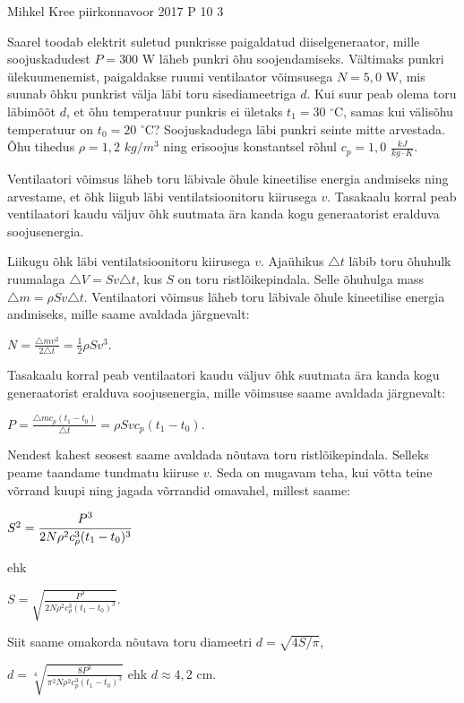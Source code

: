 {Mihkel Kree} %
{piirkonnavoor} %
{2017} %
{P 10} %
{3} %
{

\ifStatement
Saarel toodab elektrit suletud punkrisse paigaldatud diiselgeneraator, mille soojuskadudest $P = 300$ W läheb punkri õhu soojendamiseks. Vältimaks punkri ülekuumenemist, paigaldakse ruumi ventilaator võimsusega $N = 5,0$ W, mis suunab õhku punkrist välja läbi toru sisediameetriga $d$. Kui suur peab olema toru läbimõõt $d$, et õhu temperatuur punkris ei ületaks $t_1 = 30$ $^{\circ}$C, samas kui välisõhu temperatuur on $t_0 = 20$ $^{\circ}$C? Soojuskadudega läbi punkri seinte mitte arvestada. Õhu tihedus $\rho = 1,2$ $kg/m^3$ ning erisoojus konstantsel rõhul $c_p = 1,0$ $\frac{kJ}{kg \cdot K}$.
\fi

\ifHint
Ventilaatori võimsus läheb toru läbivale õhule kineetilise energia andmiseks ning arvestame, et õhk liigub läbi ventilatsioonitoru kiirusega $v$. Tasakaalu korral peab ventilaatori kaudu väljuv õhk suutmata ära kanda kogu generaatorist eralduva soojusenergia.
\fi

\ifSolution
Liikugu õhk läbi ventilatsioonitoru kiirusega $v$. Ajaühikus $\triangle t$ läbib toru õhuhulk ruumalaga $\triangle V = S v \triangle t$, kus $S$ on toru ristlõikepindala. Selle õhuhulga mass $\triangle m = \rho S v \triangle t$. Ventilaatori võimsus läheb toru läbivale õhule kineetilise energia andmiseks, mille saame avaldada järgnevalt:
\begin{center}
$N = \frac{\triangle m v^2}{2 \triangle t} = \frac{1}{2} \rho S v^3$.
\end{center}
Tasakaalu korral peab ventilaatori kaudu väljuv õhk suutmata ära kanda kogu generaatorist eralduva soojusenergia, mille võimsuse saame avaldada järgnevalt:
\begin{center}
$P = \frac{\triangle m c_p (t_1 - t_0)}{ \triangle t} = \rho S v c_p(t_1 - t_0)$.
\end{center}
Nendest kahest seosest saame avaldada nõutava toru ristlõikepindala. Selleks peame taandame tundmatu kiiruse $v$. Seda on mugavam teha, kui võtta teine võrrand kuupi ning jagada võrrandid omavahel, millest saame:
\begin{center}
$S^2 = \cfrac{P^3}{2N \rho^2 c_{\rho}^3 (t_1 - t_0)^3}$
\end{center}
ehk
\begin{center}
$S = \sqrt{\frac{P^3}{{2N \rho^2 c_{\rho}^3 (t_1 - t_0)^3}}}$.
\end{center}
Siit saame omakorda nõutava toru diameetri $d = \sqrt{4S/\pi}$,
\begin{center}
$d = \sqrt[4]{\frac{8 P^3}{\pi ^2 N \rho ^2 c_p ^3(t_1 - t_0)^3}}$ ehk $d \approx 4,2$ cm.
\end{center}
\fi
}